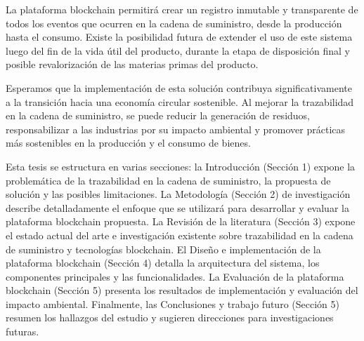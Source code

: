\documentclass{article}
\begin{document}
La plataforma blockchain permitirá crear un registro inmutable y transparente de todos los eventos que ocurren en la cadena de suministro, desde la producción hasta el consumo. Existe la posibilidad futura de extender el uso de este sistema luego del fin de la vida útil del producto, durante la etapa de disposición final y posible revalorización de las materias primas del producto.

Esperamos que la implementación de esta solución contribuya significativamente a la transición hacia una economía circular sostenible. Al mejorar la trazabilidad en la cadena de suministro, se puede reducir la generación de residuos, responsabilizar a las industrias por su impacto ambiental y promover prácticas más sostenibles en la producción y el consumo de bienes.

Esta tesis se estructura en varias secciones: la Introducción (Sección 1) expone la problemática de la trazabilidad en la cadena de suministro, la propuesta de solución y las posibles limitaciones. La Metodología (Sección 2) de investigación describe detalladamente el enfoque que se utilizará para desarrollar y evaluar la plataforma blockchain propuesta. La Revisión de la literatura (Sección 3) expone el estado actual del arte e investigación existente sobre trazabilidad en la cadena de suministro y tecnologías blockchain. El Diseño e implementación de la plataforma blockchain (Sección 4) detalla la arquitectura del sistema, los componentes principales y las funcionalidades. La Evaluación de la plataforma blockchain (Sección 5) presenta los resultados de implementación y evaluación del impacto ambiental. Finalmente, las Conclusiones y trabajo futuro (Sección 5) resumen los hallazgos del estudio y sugieren direcciones para investigaciones futuras.
\end{document}
